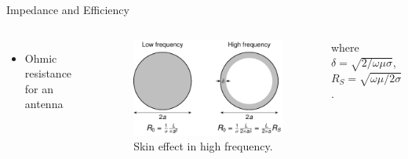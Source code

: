 \begin{frame}{Impedance and Efficiency}
\begin{columns}
        \begin{itemize}
            \item  Ohmic resistance for an antenna
        \end{itemize}
        \vspace{-3mm}
        \begin{figure}
            \centering
            \includegraphics[width=\textwidth]{Figures/Skin_effect.pdf}
            \caption{Skin effect in high frequency.}
            \label{fig:Skin_effect}
        \end{figure}
        where \(\delta = \sqrt{2/ \omega \mu \sigma}\), \( R_S = \sqrt{\omega \mu / 2 \sigma }\).        
    \end{columns}
\end{frame}